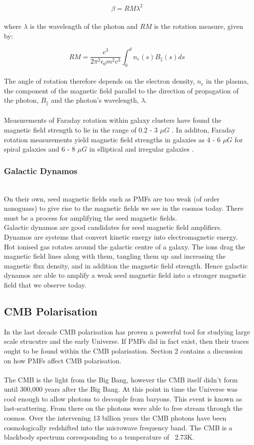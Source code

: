 \begin{equation}
\beta = RM\lambda^2
\end{equation}
\\
where $\lambda$ is the wavelength of the photon and $RM$ is the rotation measure, given by:

\begin{equation}
RM = \frac{e^3}{2\pi ^2 \epsilon_0 m^2 c^3}\int_{0}^{d} n_e(s) B_{\|}(s) ds
\end{equation}
\\
The angle of rotation therefore depends on the electron density, $n_e$ in the plasma, the component of the magnetic field parallel to the direction of propagation of the photon, $B_{\|}$ and the photon's wavelength, $\lambda$.
\\\\
Measurements of Faraday rotation within galaxy clusters have found the magnetic field strength to lie in the range of 0.2 - 3 $\mu G$ \cite{Widrow:2002ud}. In additon, Faraday rotation measurements yield magnetic field strengths in galaxies as 4 - 6 $\mu G$ for spiral galaxies and 6 - 8 $\mu G$ in elliptical and irregular galaxies \cite{Widrow:2002ud}.

\subsubsection*{Galactic Dynamos}
\\
On their own, seed magnetic fields such as PMFs are too weak (of order nanoguass) to give rise to the magnetic fields we see in the cosmos today. There must be a process for amplifying the seed magnetic fields. \\Galactic dynamos are good candidates for seed magnetic field amplifiers. Dynamos are systems that convert kinetic energy into electromagnetic energy. Hot ionised gas rotates around the galactic centre of a galaxy. The ions drag the magnetic field lines along with them, tangling them up and increasing the magnetic flux density, and in addition the magnetic field strength. Hence galactic dynamos are able to amplify a weak seed magnetic field into a stronger magnetic field that we observe today.

\subsection{CMB Polarisation}
In the last decade CMB polarisation has proven a powerful tool for studying large scale strucutre and the early Universe. If PMFs did in fact exist, then their traces ought to be found within the CMB polarisation. Section 2 contains a discussion on how PMFs affect CMB polarisation.
\\\\
The CMB is the light from the Big Bang, however the CMB itself didn't form until 300,000 years after the Big Bang. At this point in time the Universe was cool enough to allow photons to decouple from baryons. This event is known as last-scattering. From there on the photons were able to free stream through the cosmos. Over the intervening 13 billion years the CMB photons have been cosmologically redshifted into the microwave frequency band. The CMB is a blackbody spectrum corresponding to a temperature of ~2.73K.

